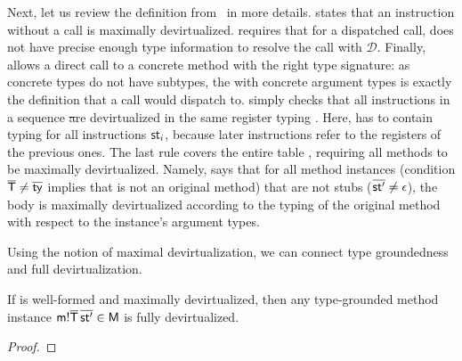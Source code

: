 Next, let us review the definition from~ in more details.
 states that an instruction without a call
is maximally devirtualized.  requires that for a dispatched call,
\ol\ty does not have precise enough type information to resolve the call with
$\mathcal{D}$. Finally,  allows a direct call to a concrete method
with the right type signature: as concrete types do not have subtypes, the
\msig\m{\ol\Ty} with concrete argument types is exactly the definition that a call
\call\m{\ol{\v\k}} would dispatch to.  simply checks that all
instructions in a sequence \ol\st are devirtualized in the same register typing
\ol\ty. Here, \ol\ty has to contain typing for all instructions $\st_i$, because
later instructions refer to the registers of the previous ones. The last rule
\devirtm{\mtbl} covers the entire table \mtbl, requiring all methods to be maximally
devirtualized. Namely,  says that for all method instances
(condition $\ol\Ty \neq \ol\ty$ implies that \msig\m{\ol\Ty}
is not an original method) that are not
stubs ($\ol{\st'} \neq \done$), the body  is maximally devirtualized
according to the typing of the original method with respect to the instance's
argument types.

Using the notion of maximal devirtualization, we can connect type groundedness
and full devirtualization.

\begin{lemma}\label{lem:full-virt}
  If \mtbl is well-formed and maximally devirtualized, then any type-grounded
  method instance $\meth\m{\ol\Ty}{\ol{\v k}}\ol{\st'} \in \mtbl$ is fully
  devirtualized.
\end{lemma}
\begin{proof}
\end{proof}

